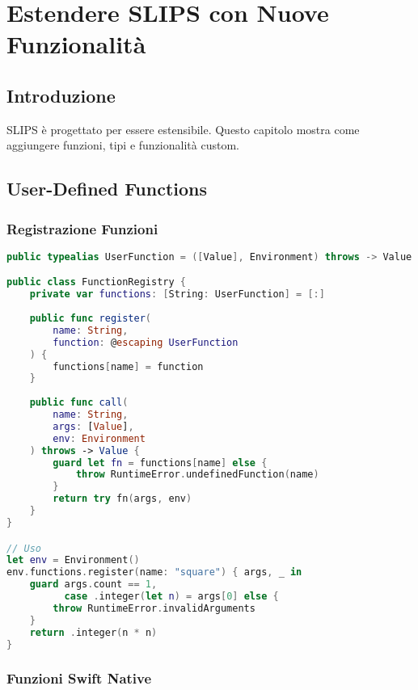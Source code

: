 
\chapter{Estendere SLIPS con Nuove Funzionalità}
\label{cap:estendere_slips}

\section{Introduzione}

SLIPS è progettato per essere estensibile. Questo capitolo mostra come aggiungere funzioni, tipi e funzionalità custom.

\section{User-Defined Functions}

\subsection{Registrazione Funzioni}

\begin{lstlisting}[language=Swift]
public typealias UserFunction = ([Value], Environment) throws -> Value

public class FunctionRegistry {
    private var functions: [String: UserFunction] = [:]
    
    public func register(
        name: String,
        function: @escaping UserFunction
    ) {
        functions[name] = function
    }
    
    public func call(
        name: String,
        args: [Value],
        env: Environment
    ) throws -> Value {
        guard let fn = functions[name] else {
            throw RuntimeError.undefinedFunction(name)
        }
        return try fn(args, env)
    }
}

// Uso
let env = Environment()
env.functions.register(name: "square") { args, _ in
    guard args.count == 1,
          case .integer(let n) = args[0] else {
        throw RuntimeError.invalidArguments
    }
    return .integer(n * n)
}
\end{lstlisting}

\subsection{Funzioni Swift Native}


